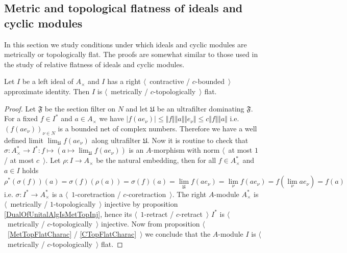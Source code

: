 
\subsection{Metric and topological flatness of ideals and cyclic modules}
\label{SubSectionMetricAndTopologicalFlatnessOfIdealsAndCyclicModules}

In this section we study conditions under which ideals and cyclic modules are metrically or topologically flat. The proofs are somewhat similar to those used in the study of relative flatness of ideals and cyclic modules.

\begin{proposition}\label{MetTopFlatIdealsInUnitalAlg} Let $I$ be a left ideal of $A_\times $ and $I$ has a right $\langle$~contractive / $c$-bounded~$\rangle$ approximate identity. Then $I$ is $\langle$~metrically / $c$-topologically~$\rangle$ flat.
\end{proposition}
\begin{proof} Let $\mathfrak{F}$ be the section filter on $N$ and let $\mathfrak{U}$ be an ultrafilter dominating $\mathfrak{F}$. For a fixed $f\in I^*$ and $a\in A_\times $ we have $|f(a e_\nu)|\leq\Vert f\Vert\Vert a\Vert\Vert e_\nu\Vert\leq c\Vert f\Vert\Vert a\Vert$ i.e. $(f(ae_\nu))_{\nu\in N}$ is a bounded net of complex numbers. Therefore we have a well defined limit $\lim_{\mathfrak{U}}f(ae_\nu)$ along ultrafilter $\mathfrak{U}$. Now it is routine to check that $\sigma:A_\times ^*\to I^*:f\mapsto (a\mapsto \lim_{\mathfrak{U}}f(ae_\nu))$ is an $A$-morphism with norm $\langle$~at most $1$ / at most $c$~$\rangle$. Let $\rho:I\to A_\times$ be the natural embedding, then for all $f\in A_\times^*$ and $a\in I$ holds
$$
\rho^*(\sigma(f))(a)
=\sigma(f)(\rho(a))
=\sigma(f)(a)
=\lim_{\mathfrak{U}}f(a e_\nu)
=\lim_{\nu}f(a e_\nu)
=f(\lim_{\nu}a e_\nu)
=f(a)
$$
i.e. $\sigma:I^*\to A_\times^*$ is a $\langle$~$1$-coretraction / $c$-coretraction~$\rangle$. The right $A$-module $A_\times ^*$ is $\langle$~metrically / $1$-topologically~$\rangle$ injective by proposition \ref{DualOfUnitalAlgIsMetTopInj}, hence its $\langle$~$1$-retract / $c$-retract~$\rangle$ $I^*$ is $\langle$~metrically / $c$-topologically~$\rangle$ injective. Now from proposition $\langle$~\ref{MetTopFlatCharac} / \ref{CTopFlatCharac}~$\rangle$ we conclude that the $A$-module $I$ is $\langle$~metrically / $c$-topologically~$\rangle$ flat.
\end{proof}

